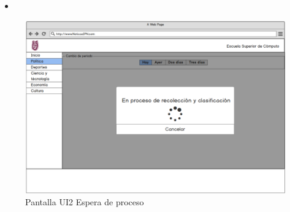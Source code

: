 \begin{itemize}

  \item {}

\end{itemize}  



\begin{figure}
  \centering 
	\includegraphics[scale=.32]{imagenes/Pantallas/UI2}
  \caption{Pantalla UI2 Espera de proceso}
  \label{fig:UI2}
\end{figure}
